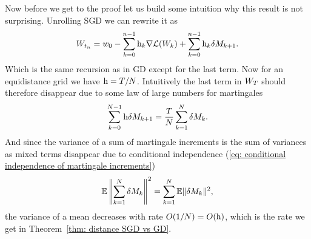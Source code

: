 Now before we get to the proof let us build some intuition why this result
is not surprising. Unrolling SGD we can rewrite it as
\begin{align*}
	W_{t_n}
	= w_0 - \sum_{k=0}^{n-1} \text{h}_k \nabla\mathcal{L}(W_k)
	+ \sum_{k=0}^{n-1} \text{h}_k\delta M_{k+1}.
\end{align*}
Which is the same recursion as in GD except for the last term. Now for an
equidistance grid we have \(\text{h}=T/N\). Intuitively the last term in \(W_T\)
should therefore disappear due to some law of large numbers for martingales
\begin{align}\label{eq: mean of martingale increments}
	\sum_{k=0}^{N-1}\text{h}\delta M_{k+1} = \frac{T}{N}\sum_{k=1}^N\delta M_k.
\end{align}
And since the variance of a sum of martingale increments is the sum of variances
as mixed terms disappear due to conditional independence (\ref{eq: conditional
independence of martingale increments})
\begin{align*}
	\mathbb{E}\left\|\sum_{k=1}^N\delta M_k\right\|^2 = \sum_{k=1}^N \mathbb{E}\|\delta M_k\|^2,
\end{align*}
the variance of a mean decreases with rate \(O(1/N)=O(\text{h})\), which is the rate
we get in Theorem~\ref{thm: distance SGD vs GD}.
